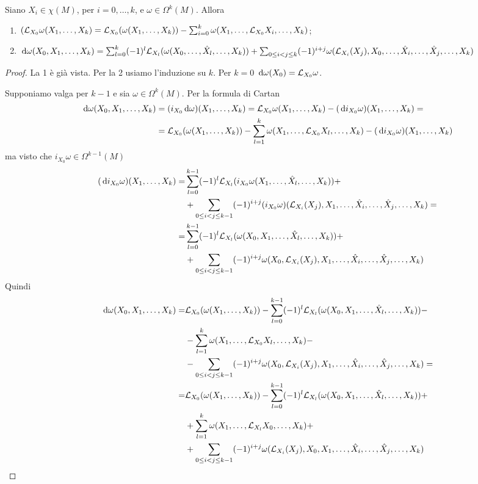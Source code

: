 \begin{proposition}
	Siano $X_i\in\chi(M)$, per $i=0,\ldots,k$, e $\omega \in \Omega^k(M)$. Allora
	\begin{enumerate}
		\item $(\Lie_{X_0} \omega (\seqb Xk,) = \Lie_{X_0}(\omega(\seqb Xk,)) - \sum_{i=0}^k \omega(X_1,\ldots, \Lie_{X_0}X_i, \ldots, X_k)$;
		\item $\de \omega (X_0,X_1,\ldots,X_k) = \sum_{l=0}^k (-1)^l\Lie_{X_l}(\omega(X_0,\ldots, \hat X_l, \ldots, X_k)) + \sum_{0\le i<j\le k}(-1)^{i+j} \omega (\Lie_{X_i}(X_j),X_0,\ldots,\hat X_i,\ldots, \hat X_j,\ldots, X_k)$
	\end{enumerate}
\end{proposition}
\begin{proof}
	La 1 è già vista. Per la 2 usiamo l'induzione su $k$.
	Per $k=0$ $\de \omega (X_0) = \Lie_{X_0} \omega$.
	
	Supponiamo valga per $k-1$ e sia $\omega \in \Omega^k(M)$. Per la formula di Cartan
	\begin{align*}
		\de \omega (X_0,\seqb Xk,) &= (i_{X_0}\de \omega)(\seqb Xk,) = \Lie_{X_0}\omega(\seqb Xk,) - (\de i_{X_0} \omega) (\seqb Xk,) =\\
		&= \Lie_{X_0}(\omega(\seqb Xk,)) - \sum_{l=1}^k \omega (X_1,\ldots,\Lie_{X_0}X_l,\ldots, X_k) -(\de i_{X_0}\omega) (\seqb Xk,)
	\end{align*}
	ma visto che $i_{X_0}\omega \in \Omega^{k-1}(M)$
	\begin{align*}
		(\de i_{X_0}\omega) (\seqb Xk,) =& \sum_{l=0}^{k-1} (-1)^l \Lie_{X_l}(i_{X_0}\omega (X_1,\ldots, \hat X_l, \ldots, X_k)) +\\
		&+\sum_{0\le i< j \le k-1} (-1)^{i+j} (i_{X_0}\omega)(\Lie_{X_i}(X_j),X_1,\ldots, \hat X_i, \ldots, \hat X_j,\ldots, X_k) = \\
		=& \sum_{l=0}^{k-1} (-1)^l \Lie_{X_l}(\omega (X_0,X_1,\ldots, \hat X_l, \ldots, X_k)) +\\
		&+\sum_{0\le i< j \le k-1} (-1)^{i+j} \omega(X_0,\Lie_{X_i}(X_j),X_1,\ldots, \hat X_i, \ldots, \hat X_j,\ldots, X_k)
	\end{align*}
	Quindi
	\begin{align*}
		\de \omega (X_0,\seqb Xk,) =& \Lie_{X_0}(\omega(\seqb Xk,)) - \sum_{l=0}^{k-1} (-1)^l \Lie_{X_l}(\omega(X_0,X_1, \ldots, \hat X_l,\ldots, X_k)) -\\
		&-\sum_{l=1}^k\omega(X_1,\ldots, \Lie_{X_0}X_l,\ldots,X_k)-\\
		&-\sum_{0\le i<j \le k-1} (-1)^{i+j} \omega (X_0,\Lie_{X_i}(X_j),X_1,\ldots,\hat X_i,\ldots,\hat X_j,\ldots,X_k)=\\
		=& \Lie_{X_0}(\omega(\seqb Xk,)) - \sum_{l=0}^{k-1} (-1)^l \Lie_{X_l}(\omega(X_0,X_1, \ldots, \hat X_l,\ldots, X_k)) +\\
		&+\sum_{l=1}^k\omega(X_1,\ldots, \Lie_{X_l}X_0,\ldots,X_k)+\\
		&+\sum_{0\le i<j \le k-1} (-1)^{i+j} \omega (\Lie_{X_i}(X_j),X_0,X_1,\ldots,\hat X_i,\ldots,\hat X_j,\ldots,X_k)
	\end{align*}

	
\end{proof}

